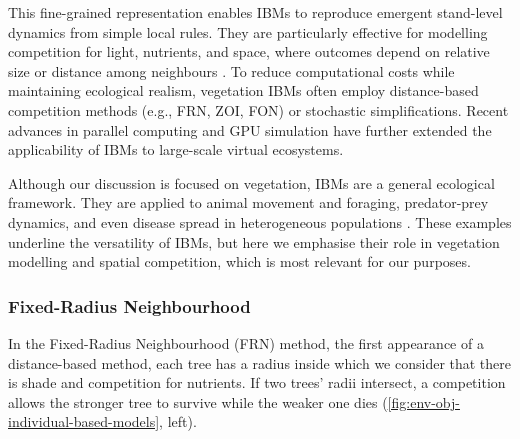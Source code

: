 This fine-grained representation enables IBMs to reproduce emergent stand-level dynamics from simple local rules. They are particularly effective for modelling competition for light, nutrients, and space, where outcomes depend on relative size or distance among neighbours \cite{McLane2011,Zhang2020}. To reduce computational costs while maintaining ecological realism, vegetation IBMs often employ distance-based competition methods (e.g., FRN, ZOI, FON) or stochastic simplifications. Recent advances in parallel computing and GPU simulation have further extended the applicability of IBMs to large-scale virtual ecosystems.

Although our discussion is focused on vegetation, IBMs are a general ecological framework. They are applied to animal movement and foraging, predator-prey dynamics, and even disease spread in heterogeneous populations \cite{Grimm2005,Chng2013,Perez2009}. These examples underline the versatility of IBMs, but here we emphasise their role in vegetation modelling and spatial competition, which is most relevant for our purposes.

\subsubsection{Fixed-Radius Neighbourhood}

In the Fixed-Radius Neighbourhood (FRN) method, the first appearance of a distance-based method, each tree has a radius inside which we consider that there is shade and competition for nutrients. If two trees' radii intersect, a competition allows the stronger tree to survive while the weaker one dies (\cref{fig:env-obj-individual-based-models}, left).


